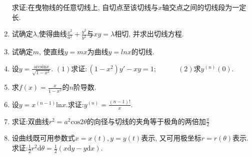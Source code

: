 \begin{enumerate}
		求证:在曳物线的任意切线上, 自切点至该切线与$x$轴交点之间的切线段为一定长.
		\item 试确定$\lambda$,使得曲线$\frac{x^2}{a^2}+\frac{y^2}{b^2}$与$xy=\lambda$相切, 并求出切线方程.
		\item 试确定$m$, 使直线$y=mx$为曲线$y=lnx$的切线.
		\item 设$y=\frac{\mathrm{arcsin}x}{\sqrt{1-x^2}}$.
		$(1)\text{求证}: (1-x^2)y'-xy=1;\qquad \quad(2)\text{求}y^{(n)}(0)$.
		\item 求$f(x)=\frac{x}{1-x^2}$的$n$阶导数.
		\item 设$y=x^(n-1)\mathrm{ln}x$.求证:$y^{(n)}=\frac{(n-1)!}{x}$.
		\item 求证:双曲线$r^2=a^2\text{cos}2\theta$的向径与切线的夹角等于极角的两倍加$\frac{\pi}{2}$
		\item 设曲线既可用参数式$x=x(t),y=y(t)$表示, 又可用极坐标$r=r(\theta)$表示.求证:$\frac{1}{2}r^2\mathrm{d}\theta=\frac{1}{2}(x\mathrm{d}y-y\mathrm{d}x)$.
		
	\end{enumerate}
